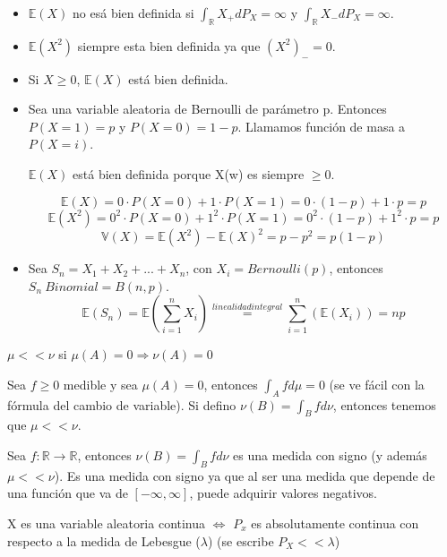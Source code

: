 \documentclass{apuntes}
\begin{document}
\begin{example}
\begin{itemize}
\item $\mathbb{E}(X)$ no esá bien definida si $\int_{\mathbb{R}}X_+ dP_X=\infty$ y $\int_{\mathbb{R}}X_- dP_X=\infty$.

\item $\mathbb{E}(X^2)$ siempre esta bien definida ya que $(X^2)_-=0$.
\item Si $X \geq 0$, $\mathbb{E}(X)$ está bien definida.
\item Sea una variable aleatoria de Bernoulli de parámetro p. Entonces $P(X=1)=p$ y $P(X=0)=1-p$. Llamamos función de masa a $P(X=i)$.

$\mathbb{E}(X)$ está bien definida porque X(w) es siempre $\geq 0$. 

\[
\mathbb{E}(X)=0\cdot P(X=0)+1\cdot P(X=1)=0\cdot(1-p)+1\cdot p=p
\]
\[
\mathbb{E}(X^2)=0^2\cdot P(X=0)+1^2\cdot P(X=1)=0^2\cdot(1-p)+1^2\cdot p=p
\]
\[
\mathbb{V}(X)=\mathbb{E}(X^2)-\mathbb{E}(X)^2=p-p^2=p(1-p)
\]
\item Sea $S_n=X_1+X_2+...+X_n$, con $X_i=Bernoulli(p)$, entonces $S_n ~ Binomial=B(n,p)$.
\[
\mathbb{E}(S_n)=\mathbb{E}(\sum_{i=1}^{n}X_i)\stackrel{linealidad integral}{=}\sum_{i=1}^{n}(\mathbb{E}(X_i))=np
\]
\end{itemize}
\end{example}




\begin{defn}
$\mu << \nu$ si $\mu(A)=0 \Rightarrow \nu(A)=0$

\begin{example}
Sea $f \geq 0$ medible y sea $\mu(A)=0$, entonces $\int_Afd\mu=0$ (se ve fácil con la fórmula del cambio de variable). Si defino $\nu(B)=\int_B fd\nu$, entonces tenemos que $\mu << \nu$.
\end{example}
\end{defn}

\begin{defn}
Sea $f:\mathbb{R}\rightarrow \mathbb{R}$, entonces $\nu(B)=\int_B fd\nu$ es una medida con signo (y además $\mu << \nu$). Es una medida con signo ya que al ser una medida que depende de una función que va de $[-\infty, \infty]$, puede adquirir valores negativos.
\end{defn}

\begin{defn}
X es una variable aleatoria continua $\Leftrightarrow$ $P_x$ es absolutamente continua con respecto a la medida de Lebesgue ($\lambda$) (se escribe $P_X << \lambda$)
\end{defn}
\end{document}

